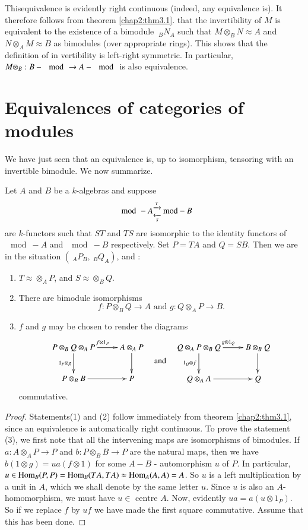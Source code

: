 This\pageoriginale equivalence is evidently right continuous (indeed, any
equivalence is). It therefore follows from theorem
\ref{chap2:thm3.1}. that the 
invertibility of $M$ is equivalent to the existence of a bimodule
$~_BN_A$ such that $M \otimes_B N \approx A$ and $N \otimes_A M
\approx B$ as bimodules (over appropriate rings). This shows that the
definition of in vertibility is left-right symmetric. In particular,
$M \otimes_B : B - \mod \to A - \mod$ is also equivalence.  


\section{Equivalences of categories of modules} %

We have just seen that an equivalence is, up to isomorphism, tensoring
with an invertible bimodule. We now summarize.  

\begin{prop}\label{chap2:prop4.1}%
Let $A$ and $B$ be a $k$-algebras and suppose  
$$
\mod - A^{\xrightarrow{T}}_{\xleftarrow[S]{~}} \, {\rm mod} - B
$$
are $k$-functors such that $ST$ and $TS$ are isomorphic to the identity
functors of $\mod-A$ and $\mod-B$ respectively. Set $P = TA$ and $Q =
SB$. Then we are in the situation $(~_A P_B, ~_BQ_A)$, and :  
\begin{enumerate}[(1)]
\item $T \approx \otimes_A P$, and $S \approx \otimes_B Q$.
\item There are bimodule isomorphisms 
$$
f : P \otimes _B Q \to A \text{ and } g : Q \otimes _A P \to B. 
$$

\item $f$ and $g$ may be chosen to render the diagrams  
\[
\vcenter{\xymatrix{
P \otimes_B Q \otimes_A P \ar[r]^{f\otimes 1_P} \ar[d]_{1_P \otimes g}
& A \otimes_A P \ar[d] \\
P \otimes_B B \ar[r] & P
}}
\quad \text{and} \quad 
\vcenter{
\xymatrix{
Q \otimes_A P \otimes_B Q \ar[r]^{g \otimes 1_Q} \ar[d]_{1_Q \otimes
  f} & B \otimes_B Q \ar[d] \\
Q \otimes_A A \ar[r] & Q
}}
\]
commutative. 
\end{enumerate}
\end{prop}

\begin{proof}
Statements\pageoriginale (1) and (2) follow immediately from theorem
\ref{chap2:thm3.1}, since an equivalence is automatically right
continuous. To prove 
the statement (3), we first note that all the intervening maps are
isomorphisms of bimodules. If $ a : A \otimes_A P \to P$ and $ b : P
\otimes_B B \to P$ are the natural maps, then we have $b(1 \otimes g)
= ua(f \otimes 1 )$ for some $A -B$ - automorphism $u$ of $P$. In
particular, $u \in \operatorname{Hom}_B (P, P) = \operatorname{Hom}_B(TA, TA) \approx \operatorname{Hom}_A(A, A) =
A$. So $u$ is a left multiplication by a unit in $A$, which we shall
denote by the same letter $u$. Since $u$ is also an $A$-homomorphism,
we must have $u \in \text{ centre }A$. Now, evidently $u a = a (u
\otimes 1_P)$. So if we replace $f$ by $uf $ we have made the first
square commutative. Assume that this has been done.  
\end{proof} 

